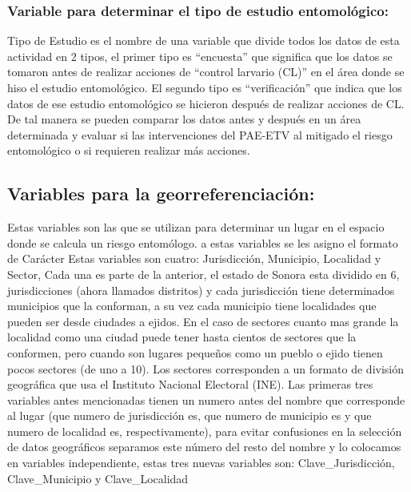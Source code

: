 \documentclass[
  letterpaper,
  twocolumn,
  landscape]{report}
\begin{document}
\subsubsection*{Variable para determinar el tipo de estudio
entomológico:}\label{variable-para-determinar-el-tipo-de-estudio-entomoluxf3gico}

Tipo de Estudio es el nombre de una variable que divide todos los datos
de esta actividad en 2 tipos, el primer tipo es ``encuesta'' que
significa que los datos se tomaron antes de realizar acciones de
``control larvario (CL)'' en el área donde se hiso el estudio
entomológico. El segundo tipo es ``verificación'' que indica que los
datos de ese estudio entomológico se hicieron después de realizar
acciones de CL. De tal manera se pueden comparar los datos antes y
después en un área determinada y evaluar si las intervenciones del
PAE-ETV al mitigado el riesgo entomológico o si requieren realizar más
acciones.

\subsection*{Variables para la
georreferenciación:}\label{variables-para-la-georreferenciaciuxf3n}

Estas variables son las que se utilizan para determinar un lugar en el
espacio donde se calcula un riesgo entomólogo. a estas variables se les
asigno el formato de Carácter Estas variables son cuatro: Jurisdicción,
Municipio, Localidad y Sector, Cada una es parte de la anterior, el
estado de Sonora esta dividido en 6, jurisdicciones (ahora llamados
distritos) y cada jurisdicción tiene determinados municipios que la
conforman, a su vez cada municipio tiene localidades que pueden ser
desde ciudades a ejidos. En el caso de sectores cuanto mas grande la
localidad como una ciudad puede tener hasta cientos de sectores que la
conformen, pero cuando son lugares pequeños como un pueblo o ejido
tienen pocos sectores (de uno a 10). Los sectores corresponden a un
formato de división geográfica que usa el Instituto Nacional Electoral
(INE). Las primeras tres variables antes mencionadas tienen un numero
antes del nombre que corresponde al lugar (que numero de jurisdicción
es, que numero de municipio es y que numero de localidad es,
respectivamente), para evitar confusiones en la selección de datos
geográficos separamos este número del resto del nombre y lo colocamos en
variables independiente, estas tres nuevas variables son:
Clave\_Jurisdicción, Clave\_Municipio y Clave\_Localidad
\end{document}
